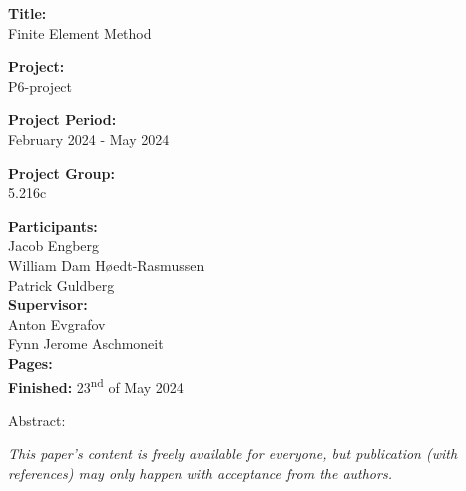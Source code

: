 \begin{minipage}[t]{0.48\textwidth}
\textbf{Title:} \\[5pt]\hspace{2ex}
{Finite Element Method}
\bigskip

\textbf{Project:} \\[5pt]\hspace{2ex}
P6-project
\bigskip

\textbf{Project Period:} \\[5pt]\hspace{2ex}
February 2024 - May 2024
\bigskip

\textbf{Project Group:} \\[5pt]\hspace{2ex}
5.216c
\bigskip

\textbf{Participants:} \\ [5pt]\hspace{2ex}%
Jacob Engberg \\%
William Dam Høedt-Rasmussen\\%
Patrick Guldberg \\%

\textbf{Supervisor:} \\ [5pt]\hspace{2ex}%
Anton Evgrafov \\
Fynn Jerome Aschmoneit \\

\textbf{Pages: \pageref{LastPage}} \\ [5pt]\hspace{2ex}
\textbf{Finished:} 23\textsuperscript{nd} of May 2024

\end{minipage}
\hfill
\begin{minipage}[t]{0.48\textwidth}
Abstract: \\[5pt]
\fbox{\parbox{6.8cm}{\bigskip}}
\end{minipage}
\hspace*{4ex}

\vfill

{\footnotesize \textit{This paper's content is freely available for everyone, but publication (with references) may only happen with acceptance from the authors.}}